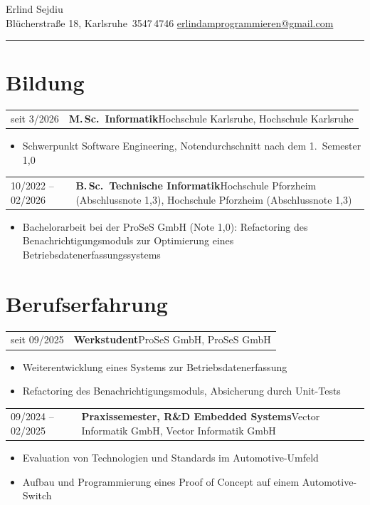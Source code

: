 \documentclass[a4paper,10pt]{article}
\makeatletter
\newlength{\datecol}\setlength{\datecol}{3.8cm}
\newcommand{\eintrag}[3]{%
    \noindent
    \begin{tabularx}{\textwidth}{@{}p{\datecol}@{}X@{}}
        \textcolor{muted}{#1} & \textbf{#2}\ifx\relax#3\relax\else, #3\fi
    \end{tabularx}%
    \par\nobreak
}
\newenvironment{details}
    {\begin{itemize}[leftmargin=\dimexpr\datecol+0.9em\relax, labelsep=0.5em,
                     labelindent=\datecol, topsep=0.15em, itemsep=0.1em,
                     parsep=0pt, label=\textcolor{hairline}{\textbf{\textperiodcentered}}]}
    {\end{itemize}\vspace{0.2em}}
\makeatother
\begin{document}
{\huge Erlind Sejdiu}\\[0.35em]
{\small\color{muted}
Blücherstraße 18, Karlsruhe \enspace\textbar{}\,3547\,4746 \enspace\textbar\enspace
\href{mailto:erlindamprogrammieren@gmail.com}{erlindamprogrammieren@gmail.com}}\\[0.45em]
\textcolor{hairline}{\rule{\linewidth}{0.7pt}}

\vspace{0.5em}

\section{Bildung}

\eintrag{seit 3/2026}{M.\,Sc.\ Informatik}{Hochschule Karlsruhe}
\begin{details}
    \item Schwerpunkt Software Engineering, Notendurchschnitt nach dem 1.~Semester 1,0
\end{details}

\eintrag{10/2022 -- 02/2026}{B.\,Sc.\ Technische Informatik}{Hochschule Pforzheim \normalfont(Abschlussnote 1,3)}
\begin{details}
    \item Bachelorarbeit bei der ProSeS GmbH (Note 1,0): \glqq Refactoring des Benachrichtigungs\-moduls
          zur Optimierung eines Betriebsdatenerfassungssystems\grqq
\end{details}

\section{Berufserfahrung}

\eintrag{seit 09/2025}{Werkstudent}{ProSeS GmbH}
\begin{details}
    \item Weiterentwicklung eines Systems zur Betriebsdatenerfassung
    \item Refactoring des Benachrichtigungsmoduls, Absicherung durch Unit-Tests
\end{details}

\eintrag{09/2024 -- 02/2025}{Praxissemester, R\&D Embedded Systems}{Vector Informatik GmbH}
\begin{details}
    \item Evaluation von Technologien und Standards im Automotive-Umfeld
    \item Aufbau und Programmierung eines Proof of Concept auf einem Automotive-Switch
\end{details}
\end{document}
